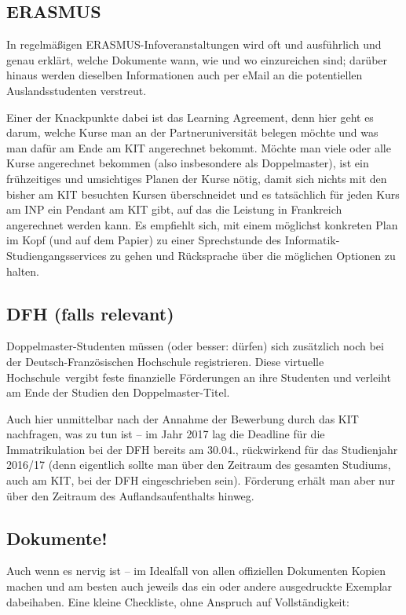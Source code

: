 \documentclass[11pt,a4paper]{article}
\begin{document}
	\subsection{ERASMUS}
	
	In regelmäßigen ERASMUS-Infoveranstaltungen wird oft und ausführlich und genau erklärt, welche Dokumente wann, wie und wo einzureichen sind; darüber hinaus werden dieselben Informationen auch per eMail an die potentiellen Auslandsstudenten verstreut. 
	
	Einer der Knackpunkte dabei ist das Learning Agreement, denn hier geht es darum, welche Kurse man an der Partneruniversität belegen möchte und was man dafür am Ende am KIT angerechnet bekommt. Möchte man viele oder alle Kurse angerechnet bekommen (also insbesondere als Doppelmaster), ist ein frühzeitiges und umsichtiges Planen der Kurse nötig, damit sich nichts mit den bisher am KIT besuchten Kursen überschneidet und es tatsächlich für jeden Kurs am INP ein Pendant am KIT gibt, auf das die Leistung in Frankreich angerechnet werden kann. Es empfiehlt sich, mit einem möglichst konkreten Plan im Kopf (und auf dem Papier) zu einer Sprechstunde des Informatik-Studiengangsservices zu gehen und Rücksprache über die möglichen Optionen zu halten.
	
	\subsection{DFH (falls relevant)}
	
	Doppelmaster-Studenten müssen (oder besser: dürfen) sich zusätzlich noch bei der Deutsch-Französischen Hochschule registrieren. Diese \glqq virtuelle Hochschule\grqq\ vergibt feste finanzielle Förderungen an ihre Studenten und verleiht am Ende der Studien den Doppelmaster-Titel. 
	
	Auch hier unmittelbar nach der Annahme der Bewerbung durch das KIT nachfragen, was zu tun ist -- im Jahr 2017 lag die Deadline für die Immatrikulation bei der DFH bereits am 30.04., rückwirkend für das Studienjahr 2016/17 (denn eigentlich sollte man über den Zeitraum des gesamten Studiums, auch am KIT, bei der DFH eingeschrieben sein). Förderung erhält man aber nur über den Zeitraum des Auflandsaufenthalts hinweg.
	
	\subsection{Dokumente!}
		
	Auch wenn es nervig ist -- im Idealfall von allen offiziellen Dokumenten Kopien machen und am besten auch jeweils das ein oder andere ausgedruckte Exemplar dabeihaben. Eine kleine Checkliste, ohne Anspruch auf Vollständigkeit:
	
\end{document}
